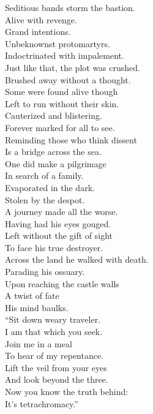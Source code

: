 Seditious bands storm the bastion. \\
Alive with revenge. \\
Grand intentions. \\
Unbeknownst protomartyrs. \\
Indoctrinated with impalement. \\

Just like that, the plot was crushed. \\
Brushed away without a thought. \\
Some were found alive though \\
Left to run without their skin. \\
Cauterized and blistering. \\
Forever marked for all to see. \\
Reminding those who think dissent \\
Is a bridge across the sea. \\

One did make a pilgrimage \\
In search of a family. \\
Evaporated in the dark. \\
Stolen by the despot. \\
A journey made all the worse. \\
Having had his eyes gouged. \\
Left without the gift of sight \\
To face his true destroyer. \\

Across the land he walked with death. \\
Parading his ossuary. \\
Upon reaching the castle walls \\
A twist of fate \\
His mind baulks. \\

``Sit down weary traveler. \\
I am that which you seek. \\
Join me in a meal \\
To hear of my repentance. \\
Lift the veil from your eyes \\
And look beyond the three. \\
Now you know the truth behind: \\
It's tetrachromacy.'' \\


